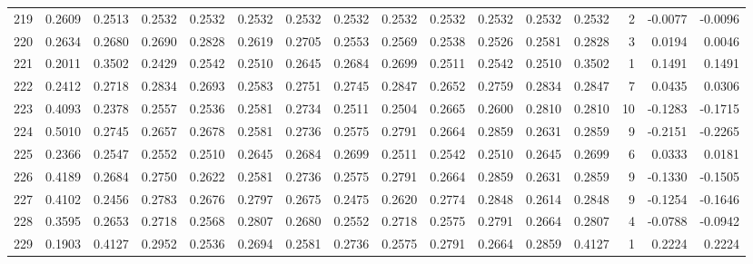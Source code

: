 \begin{tabular}{lrrrrrrrrrrrrrrr}
219 &      0.2609 &  0.2513 &  0.2532 &  0.2532 &  0.2532 &  0.2532 &  0.2532 &  0.2532 &  0.2532 &  0.2532 &   0.2532 &     0.2532 &      2 &                   -0.0077 &                    -0.0096 \\
220 &      0.2634 &  0.2680 &  0.2690 &  0.2828 &  0.2619 &  0.2705 &  0.2553 &  0.2569 &  0.2538 &  0.2526 &   0.2581 &     0.2828 &      3 &                    0.0194 &                     0.0046 \\
221 &      0.2011 &  0.3502 &  0.2429 &  0.2542 &  0.2510 &  0.2645 &  0.2684 &  0.2699 &  0.2511 &  0.2542 &   0.2510 &     0.3502 &      1 &                    0.1491 &                     0.1491 \\
222 &      0.2412 &  0.2718 &  0.2834 &  0.2693 &  0.2583 &  0.2751 &  0.2745 &  0.2847 &  0.2652 &  0.2759 &   0.2834 &     0.2847 &      7 &                    0.0435 &                     0.0306 \\
223 &      0.4093 &  0.2378 &  0.2557 &  0.2536 &  0.2581 &  0.2734 &  0.2511 &  0.2504 &  0.2665 &  0.2600 &   0.2810 &     0.2810 &     10 &                   -0.1283 &                    -0.1715 \\
224 &      0.5010 &  0.2745 &  0.2657 &  0.2678 &  0.2581 &  0.2736 &  0.2575 &  0.2791 &  0.2664 &  0.2859 &   0.2631 &     0.2859 &      9 &                   -0.2151 &                    -0.2265 \\
225 &      0.2366 &  0.2547 &  0.2552 &  0.2510 &  0.2645 &  0.2684 &  0.2699 &  0.2511 &  0.2542 &  0.2510 &   0.2645 &     0.2699 &      6 &                    0.0333 &                     0.0181 \\
226 &      0.4189 &  0.2684 &  0.2750 &  0.2622 &  0.2581 &  0.2736 &  0.2575 &  0.2791 &  0.2664 &  0.2859 &   0.2631 &     0.2859 &      9 &                   -0.1330 &                    -0.1505 \\
227 &      0.4102 &  0.2456 &  0.2783 &  0.2676 &  0.2797 &  0.2675 &  0.2475 &  0.2620 &  0.2774 &  0.2848 &   0.2614 &     0.2848 &      9 &                   -0.1254 &                    -0.1646 \\
228 &      0.3595 &  0.2653 &  0.2718 &  0.2568 &  0.2807 &  0.2680 &  0.2552 &  0.2718 &  0.2575 &  0.2791 &   0.2664 &     0.2807 &      4 &                   -0.0788 &                    -0.0942 \\
229 &      0.1903 &  0.4127 &  0.2952 &  0.2536 &  0.2694 &  0.2581 &  0.2736 &  0.2575 &  0.2791 &  0.2664 &   0.2859 &     0.4127 &      1 &                    0.2224 &                     0.2224 \\

\end{tabular}
